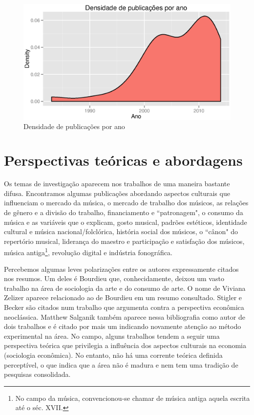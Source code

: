 \documentclass[a4paper, 12pt, openright, oneside, german, french, english, brazil]{abntex2}
\begin{document}
	\begin{figure}
		\centering
		\caption{Densidade de publicações por ano}
		\label{grafico-densidade}
		\includegraphics[scale=.6]{anodensidade.eps}
	\end{figure}



		\section{Perspectivas teóricas e abordagens}

		Os temas de investigação aparecem nos trabalhos de uma maneira bastante difusa. Encontramos algumas publicações abordando aspectos culturais que influenciam o mercado da música, o mercado de trabalho dos músicos, as relações de gênero e a divisão do trabalho, financiamento e ``patronagem", o consumo da música e as variáveis que o explicam, gosto musical, padrões estéticos, identidade cultural e música nacional/folclórica, história social dos músicos, o ``cânon" do repertório musical, liderança do maestro e participação e satisfação dos músicos, música antiga\footnote{No campo da música, convencionou-se chamar de música antiga aquela escrita até o séc. XVII.}, revolução digital e indústria fonográfica.

		Percebemos algumas leves polarizações entre os autores expressamente citados nos resumos. Um deles é Bourdieu que, conhecidamente, deixou um vasto trabalho na área de sociologia da arte e do consumo de arte. O nome de Viviana Zelizer aparece relacionado ao de Bourdieu em um resumo consultado. Stigler e Becker são citados num trabalho que argumenta contra a perspectiva econômica neoclássica. Matthew Salganik também aparece nessa bibliografia como autor de dois trabalhos e é citado por mais um indicando novamente atenção ao método experimental na área. No campo, alguns trabalhos tendem a seguir uma perspectiva teórica que privilegia a influência dos aspectos culturais na economia (sociologia econômica). No entanto, não há uma corrente teórica definida perceptível, o que indica que a área não é madura e nem tem uma tradição de pesquisas consolidada.
\end{document}
